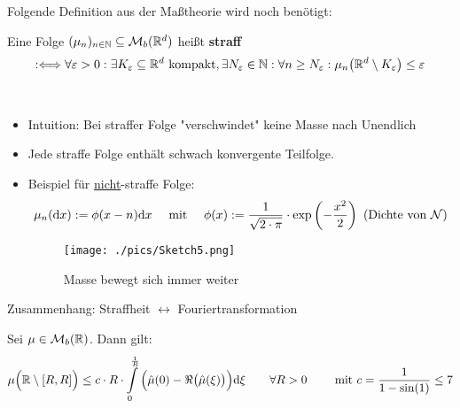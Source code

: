 Folgende Definition aus der Maßtheorie wird noch benötigt:

\begin{defi}[Straffheit]
	Eine Folge $(\mu_n)_{n\in\mathbb{N}}\subseteq\mathcal{M}_b(\mathbb{R}^d)$ heißt \textbf{straff}
	\begin{align*}
		:\Longleftrightarrow
		\forall\varepsilon>0:\exists K_\varepsilon\subseteq\mathbb{R}^d\text{ kompakt},\exists N_\varepsilon\in\mathbb{N}:\forall n\geq N_\varepsilon:
		\mu_n\big(\mathbb{R}^d\setminus K_\varepsilon\big)\leq\varepsilon
	\end{align*}
\end{defi}

\begin{bemerkung}\
	\begin{itemize}
		\item Intuition: Bei straffer Folge "verschwindet" keine Masse nach Unendlich
		\item Jede straffe Folge enthält schwach konvergente Teilfolge.
		\item Beispiel für \underline{nicht}-straffe Folge: 
		\begin{align*}
			\mu_n(\mathrm{d} x):=\phi(x-n)\mathrm{d} x
			\quad\text{ mit }\quad
			\phi(x):=\frac{1}{\sqrt{2\cdot\pi}}\cdot\exp\left(-\frac{x^2}{2}\right)\text{
			(Dichte von $\mathcal{N}$)}
		\end{align*}

		\begin{figure}[H]
			\begin{center}
				\texttt{[image: ./pics/Sketch5.png]}
				\caption{Masse bewegt sich immer weiter}
				\label{AbbNichtStraffesMass}
			\end{center}
		\end{figure}
	\end{itemize}
\end{bemerkung}

Zusammenhang: Straffheit $\longleftrightarrow$ Fouriertransformation

\begin{lemma}\label{lemma8.5}
	Sei $\mu\in\mathcal{M}_b(\mathbb{R})$.
	Dann gilt:
	\begin{align*}
		\mu\Big(\mathbb{R}\setminus[R,R]\Big)\leq
		c\cdot R\cdot\int\limits_0^{\frac{1}{R}}\Big(\hat{\mu}(0)-\Re\big(\hat{\mu}(\xi)\big)\Big)\mathrm{d}\xi
		\qquad\forall R>0\qquad
		\text{ mit } c=\frac{1}{1-\sin(1)}\leq 7
	\end{align*}
\end{lemma}

